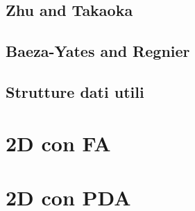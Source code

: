 \documentclass{beamer}
\begin{document}
\subsection{Zhu and Takaoka}
\begin{frame}


\end{frame}
\subsection{Baeza-Yates and Regnier}
\begin{frame}


\end{frame}
\subsection{Strutture dati utili}
\begin{frame}


\end{frame}


\section{2D con FA}
\begin{frame}


\end{frame}

\section{2D con PDA}
\end{document}
